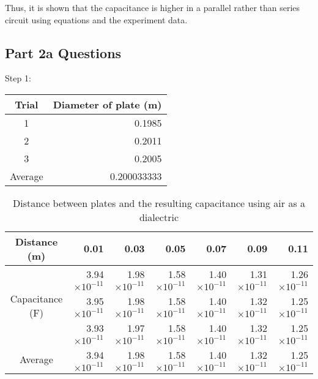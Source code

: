 \documentclass [12pt, letterpaper, twoside] {article}
\begin{document}
\noindent
Thus, it is shown that the capacitance is higher in a parallel rather than series circuit using equations and the experiment data.

\subsection* {Part 2a Questions}
Step 1:

\begin{table}[h!]
  \centering
  \begin{tabular}{| c | r |}
    \hline\hline
    Trial & Diameter of plate (m) \\
    \hline
    1 & 0.1985 \\
    \hline
    2 & 0.2011 \\
    \hline
    3 & 0.2005 \\
    \hline
    Average & 0.200033333 \\
    \hline\hline
  \end{tabular}
\end{table}

\begin{table}[h!]
  \centering
  \begin{tabular}{| c | r | r | r | r | r | r |}
    \hline\hline
    Distance (m) & 0.01 & 0.03 & 0.05 & 0.07 & 0.09 & 0.11 \\
    \hline
    \multirow {3}{*}{Capacitance (F)} & 3.94\(\times10^{-11}\) & 1.98\(\times10^{-11}\) & 1.58\(\times10^{-11}\) & 1.40\(\times10^{-11}\) & 1.31\(\times10^{-11}\) & 1.26\(\times10^{-11}\) \\
    & 3.95\(\times10^{-11}\) & 1.98\(\times10^{-11}\) & 1.58\(\times10^{-11}\) & 1.40\(\times10^{-11}\) & 1.32\(\times10^{-11}\) & 1.25\(\times10^{-11}\) \\
    & 3.93\(\times10^{-11}\) & 1.97\(\times10^{-11}\) & 1.58\(\times10^{-11}\) & 1.40\(\times10^{-11}\) & 1.32\(\times10^{-11}\) & 1.25\(\times10^{-11}\) \\
    \hline
    Average & 3.94\(\times10^{-11}\) & 1.98\(\times10^{-11}\) & 1.58\(\times10^{-11}\) & 1.40\(\times10^{-11}\) & 1.32\(\times10^{-11}\) & 1.25\(\times10^{-11}\) \\ %
    \hline\hline
  \end{tabular}
  \caption{Distance between plates and the resulting capacitance using air as a dialectric}
\end{table}
\end{document}
